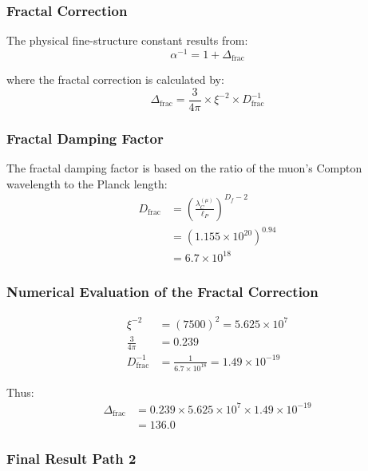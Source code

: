 \documentclass[12pt,a4paper]{article}
\theoremstyle{definition}
\begin{document}
	\subsubsection{Fractal Correction}
	
	The physical fine-structure constant results from:
	\begin{equation}
		\alpha^{-1} = 1 + \Delta_{\text{frac}}
	\end{equation}
	
	where the fractal correction is calculated by:
	\begin{equation}
		\Delta_{\text{frac}} = \frac{3}{4\pi} \times \xi^{-2} \times D_{\text{frac}}^{-1}
	\end{equation}
	
	\subsubsection{Fractal Damping Factor}
	
	The fractal damping factor is based on the ratio of the muon's Compton wavelength to the Planck length:
	\begin{align}
		D_{\text{frac}} &= \left(\frac{\lambda_C^{(\mu)}}{\ell_P}\right)^{D_f - 2} \\
		&= \left(1.155 \times 10^{20}\right)^{0.94} \\
		&= 6.7 \times 10^{18}
	\end{align}
	
	\subsubsection{Numerical Evaluation of the Fractal Correction}
	
	\begin{align}
		\xi^{-2} &= \left(7500\right)^2 = 5.625 \times 10^7 \\
		\frac{3}{4\pi} &= 0.239 \\
		D_{\text{frac}}^{-1} &= \frac{1}{6.7 \times 10^{18}} = 1.49 \times 10^{-19}
	\end{align}
	
	Thus:
	\begin{align}
		\Delta_{\text{frac}} &= 0.239 \times 5.625 \times 10^7 \times 1.49 \times 10^{-19} \\
		&= 136.0
	\end{align}
	
	\subsubsection{Final Result Path 2}
	
\end{document}
